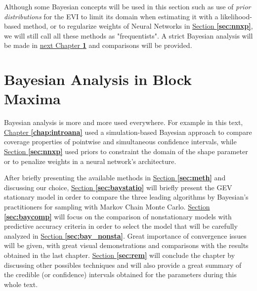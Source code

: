 \documentclass[11pt,a4paper,openany, twosided]{book}
\begin{document}
Although some Bayesian concepts will be used in this section such as use of \emph{prior distributions} for the EVI to limit its domain when estimating it with a likelihood-based method, or to regularize weights of Neural Networks in \hyperref[sec:nnxp]{Section \textbf{\ref{sec:nnxp}}}, we will still call all these methods as "frequentists".
A strict Bayesian analysis will be made in \hyperref[sec:anabayes]{next Chapter \textbf{\ref{sec:anabayes}}} and comparisons will be provided.

\newpage

\chapter{Bayesian Analysis in Block Maxima}\label{sec:anabayes}
\minitoc \thispagestyle{empty}
 \vspace{1cm}
 
Bayesian analysis is more and more used everywhere. For example in this text,  \hyperref[chap:introana]{Chapter \textbf{\ref{chap:introana}}} used a simulation-based Bayesian approach to compare coverage properties of pointwise and simultaneous confidence intervals, while \hyperref[sec:nnxp]{Section \textbf{\ref{sec:nnxp}}} used priors to constraint the domain of the shape parameter or to penalize weights in a neural network's architecture. %

After briefly presenting the available methods in \hyperref[sec:meth]{Section \textbf{\ref{sec:meth}}} and discussing our choice, \hyperref[sec:baystatio]{Section \textbf{\ref{sec:baystatio}}} will briefly present the GEV stationary model in order to compare the three leading algorithms by Bayesian's practitioners for sampling with Markov Chain Monte Carlo. \hyperref[sec:baycomp]{Section \textbf{\ref{sec:baycomp}}} will focus on the comparison of nonstationary models with predictive accuracy criteria in order to select the model that will be carefully analyzed in 
\hyperref[sec:bay_nonsta]{Section \textbf{\ref{sec:bay_nonsta}}}. Great importance of convergence issues will be given, with great visual demonstrations and comparisons with the results obtained in the last chapter. 
\hyperref[sec:rem]{Section \textbf{\ref{sec:rem}}} will conclude the chapter by discussing other possibles techniques and will also provide a great summary of the credible (or confidence) intervals obtained for the parameters during this whole text.
\end{document}
